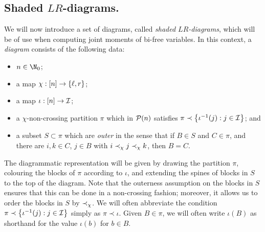 \subsection{Shaded $LR$-diagrams.}
\label{ss:shadedlrdiagrams}
We will now introduce a set of diagrams, called \emph{shaded $LR$-diagrams}, which will be of use when computing joint moments of bi-free variables.
In this context, a \emph{diagram} consists of the following data:
\begin{itemize}
	\item $n \in \N_0$;
	\item a map $\chi : [n] \to \left\{\ell, r\right\}$;
	\item a map $\iota : [n] \to \mathcal{I}$;
	\item a $\chi$-non-crossing partition $\pi$ which in $\mathcal{P}(n)$ satisfies $\pi \prec \left\{\iota^{-1}(j) : j \in \mathcal{I}\right\}$; and
	\item a subset $S \subset \pi$ which are \emph{outer} in the sense that if $B \in S$ and $C \in \pi$, and there are $i,k \in C$, $j \in B$ with $i \prec_\chi j \prec_\chi k$, then $B = C$.
\end{itemize}
The diagrammatic representation will be given by drawing the partition $\pi$, colouring the blocks of $\pi$ according to $\iota$, and extending the spines of blocks in $S$ to the top of the diagram.
Note that the outerness assumption on the blocks in $S$ ensures that this can be done in a non-crossing fashion; moreover, it allows us to order the blocks in $S$ by $\prec_\chi$.
We will often abbreviate the condition $\pi \prec \left\{\iota^{-1}(j) : j \in \mathcal{I}\right\}$ simply as $\pi \prec \iota$.
Given $B \in \pi$, we will often write $\iota(B)$ as shorthand for the value $\iota(b)$ for $b \in B$.

